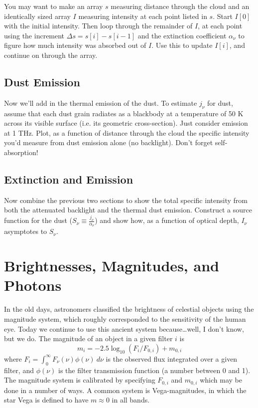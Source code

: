 \documentclass[11pt]{article}
\begin{document}
You may want to make an
array $s$ measuring distance through the cloud and an identically sized array $I$ measuring intensity at each point listed
in $s$.  Start $I[0]$ with the initial intensity.  Then loop through the remainder of $I$, at each point using the increment
$\Delta s=s[i]-s[i-1]$ and the extinction coefficient $\alpha_\nu$ to figure how much intensity was absorbed out of $I$.  Use
this to update $I[i]$, and continue on through the array.

\subsection{Dust Emission}

Now we'll add in the thermal emission of the dust.  To estimate $j_\nu$ for dust, assume that each dust grain
radiates as a blackbody at a temperature of 50 K across its visible surface (i.e. its geometric cross-section).
Just consider emission at 1 THz.  Plot, as a function of distance through the cloud the specific intensity you'd
measure from dust emission alone (no backlight).  Don't forget self-absorption!

\subsection{Extinction and Emission}

Now combine the previous two sections to show the total specific intensity from both the attenuated backlight
and the thermal dust emission.  Construct a source function for the dust ($S_\nu\equiv\frac{j_\nu}{\alpha_\nu}$)
and show how, as a function of optical depth, $I_\nu$ asymptotes to $S_\nu$.


\section{Brightnesses, Magnitudes, and Photons}
\vspace{-6pt}

In the old days, astronomers classified the brightness of celestial
objects using the magnitude system, which roughly corresponded to the
sensitivity of the human eye. Today we continue to use this ancient system
because\dots well, I don't know, but we do. The magnitude of
an object in a given filter $i$ is
\begin{equation}m_i = −2.5 \log_{10}(F_i/F_{0,i}) + m_{0,i}
\end{equation}
where $F_i = \int_0^\infty{F_\nu(\nu)\phi(\nu)~d\nu}$
is the observed flux integrated over a given filter, and
$\phi(\nu)$ is the filter transmission function (a number
between 0 and 1). The magnitude system is calibrated by specifying $F_{0,i}$ and $m_{0,i}$ which
may be done in a number of ways. A common system is 
Vega-magnitudes, in which the star Vega is defined to have $m\approx0$ in all bands.
\end{document}
